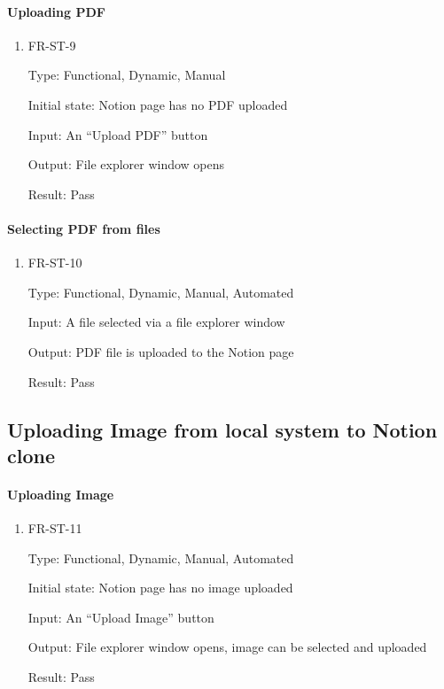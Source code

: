 \documentclass[12pt, titlepage]{article}
\begin{document}
\paragraph{Uploading PDF}

\begin{enumerate}

\item{FR-ST-9\\}

Type: Functional, Dynamic, Manual 

Initial state: Notion page has no PDF uploaded 

Input: An “Upload PDF” button 

Output: File explorer window opens 

Result: Pass

\end{enumerate}

\paragraph{Selecting PDF from files}

\begin{enumerate}

\item{FR-ST-10\\}

Type: Functional, Dynamic, Manual, Automated 

Input: A file selected via a file explorer window 

Output: PDF file is uploaded to the Notion page 

Result: Pass 

\end{enumerate}

\subsection{Uploading Image from local system to Notion clone}

\paragraph{Uploading Image}

\begin{enumerate}

\item{FR-ST-11\\}

Type: Functional, Dynamic, Manual, Automated 

Initial state: Notion page has no image uploaded 

Input: An “Upload Image” button 

Output: File explorer window opens, image can be selected and uploaded 

Result: Pass 

\end{enumerate}
\end{document}
